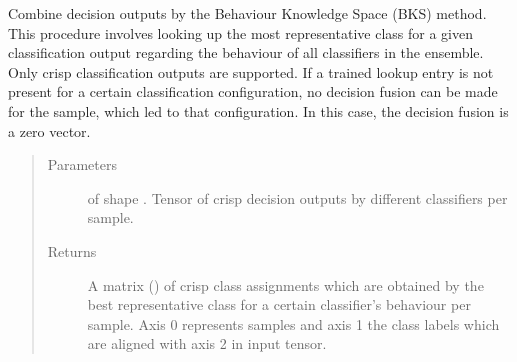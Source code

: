 \documentclass[letterpaper,10pt,english]{sphinxmanual}
\begin{document}
\begin{fulllineitems}
\begin{fulllineitems}
\label{\detokenize{pusion.core.behaviour_knowledge_space_combiner:pusion.core.behaviour_knowledge_space_combiner.BehaviourKnowledgeSpaceCombiner.combine}}
\sphinxAtStartPar
Combine decision outputs by the Behaviour Knowledge Space (BKS) method. This procedure involves looking up the
most representative class for a given classification output regarding the behaviour of all classifiers in the
ensemble. Only crisp classification outputs are supported. If a trained lookup entry is not present for a
certain classification configuration, no decision fusion can be made for the sample, which led to that
configuration. In this case, the decision fusion is a zero vector.
\begin{quote}\begin{description}
\item[{Parameters}] \leavevmode
\sphinxAtStartPar
{} \textendash{}  of shape .
Tensor of crisp decision outputs by different classifiers per sample.

\item[{Returns}] \leavevmode
\sphinxAtStartPar
A matrix () of crisp class assignments which are obtained by the best representative class
for a certain classifier’s behaviour per sample. Axis 0 represents samples and axis 1 the class labels
which are aligned with axis 2 in  input tensor.

\end{description}\end{quote}

\end{fulllineitems}


\end{fulllineitems}

\end{document}
